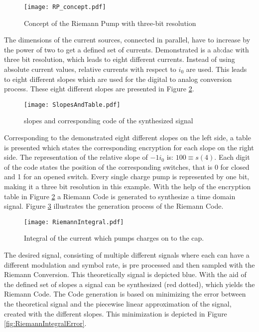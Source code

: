 \begin{figure}[ht]
	\centering
  \texttt{[image: RP\_concept.pdf]}
	\caption{Concept of the Riemann Pump with three-bit resolution}
	\label{fig:RiemannPumpConcept}
\end{figure}

The dimensions of the current sources, connected in parallel, have to increase by the power of two to get a defined set of currents.
Demonstrated is a \gls{ab:dac} with three bit resolution, which leads to eight different currents.
Instead of using absolute current values, relative currents with respect to $i_0$ are used.
This leads to eight different slopes which are used for the digital to analog conversion process.
These eight different slopes are presented in Figure \ref{fig:SlopesAndTable}.

\begin{figure}[ht]
	\centering
  \texttt{[image: SlopesAndTable.pdf]}
	\caption{slopes and corresponding code of the synthesized signal}
	\label{fig:SlopesAndTable}
\end{figure}

Corresponding to the demonstrated eight different slopes on the left side, a table is presented which states the corresponding encryption for each slope on the right side.
The representation of the relative slope of $-1 i_0$ is: $1 0 0 \equiv s(4)$.
Each digit of the code states the position of the corresponding switches, that is 0 for closed and 1 for an opened switch.
Every single charge pump is represented by one bit, making it a three bit resolution in this example.
With the help of the encryption table in Figure \ref{fig:SlopesAndTable} a Riemann Code is generated to synthesize a time domain signal.
Figure \ref{fig:RiemannIntegral} illustrates the generation process of the Riemann Code.

\begin{figure}[ht]
	\centering
  \texttt{[image: RiemannIntegral.pdf]}
	\caption{Integral of the current which pumps charges on to the cap.}
	\label{fig:RiemannIntegral}
\end{figure}

The desired signal, consisting of multiple different signals where each can have a different modulation and symbol rate, is pre processed and then sampled with the Riemann Conversion.
This theoretically signal is depicted blue.
With the aid of the defined set of slopes a signal can be synthesized (red dotted), which yields the Riemann Code.
The Code generation is based on minimizing the error between the theoretical signal and the piecewise linear approximation of the signal, created with the different slopes.
This minimization is depicted in Figure \ref{fig:RiemannIntegralError}. 

